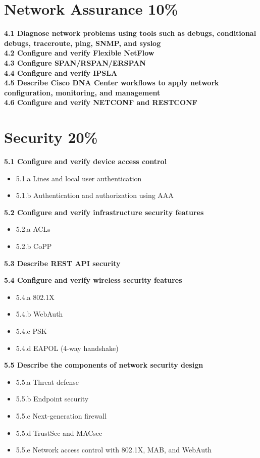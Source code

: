 \documentclass{article}
\begin{document}
\section{Network Assurance 10\%}
\noindent\textbf{4.1 Diagnose network problems using tools such as debugs, conditional debugs, traceroute, ping, SNMP, and syslog}\\
\noindent\textbf{4.2 Configure and verify Flexible NetFlow}\\
\noindent\textbf{4.3 Configure SPAN/RSPAN/ERSPAN}\\
\noindent\textbf{4.4 Configure and verify IPSLA}\\
\noindent\textbf{4.5 Describe Cisco DNA Center workflows to apply network configuration, monitoring, and management}\\
\noindent\textbf{4.6 Configure and verify NETCONF and RESTCONF}\\

\newpage
\section{Security 20\%}
\noindent\textbf{5.1 Configure and verify device access control}
\begin{itemize}
\item 5.1.a Lines and local user authentication
\item 5.1.b Authentication and authorization using AAA
\end{itemize}

\noindent\textbf{5.2 Configure and verify infrastructure security features}
\begin{itemize}
\item 5.2.a ACLs
\item 5.2.b CoPP
\end{itemize}

\noindent\textbf{5.3 Describe REST API security}

\noindent\textbf{5.4 Configure and verify wireless security features}
\begin{itemize}
\item 5.4.a 802.1X
\item 5.4.b WebAuth
\item 5.4.c PSK
\item 5.4.d EAPOL (4-way handshake)
\end{itemize}

\noindent\textbf{5.5 Describe the components of network security design}
\begin{itemize}
\item 5.5.a Threat defense
\item 5.5.b Endpoint security
\item 5.5.c Next-generation firewall
\item 5.5.d TrustSec and MACsec
\item 5.5.e Network access control with 802.1X, MAB, and WebAuth
\end{itemize}
\end{document}

